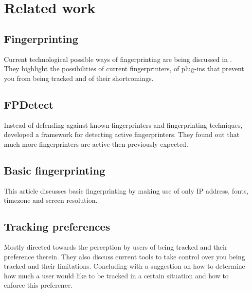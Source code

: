 \section{Related work}

\subsection{Fingerprinting}

Current technological possible ways of fingerprinting
are being discussed in \citep{nikiforakis2014workings}.
They highlight the possibilities of current fingerprinters,
of plug-ins that prevent you from being tracked
and of their shortcomings.

\subsection{FPDetect}

Instead of defending against known fingerprinters
and fingerprinting techniques,
\citep{acar2013fpdetective} developed a framework
for detecting active fingerprinters.
They found out
that much more fingerprinters are active then previously expected.

\subsection{Basic fingerprinting}

This article discusses basic fingerprinting
by making use of only IP address, fonts, timezone and screen resolution.
\citep{boda2011user}

\subsection{Tracking preferences}

Mostly directed towards the perception by users of being tracked
and their preference therein.
\citep{melicher2015not}
They also discuss current tools to take control over you being tracked
and their limitations.
Concluding with a suggestion on how to determine
how much a user would like to be tracked in a certain situation
and how to enforce this preference.
